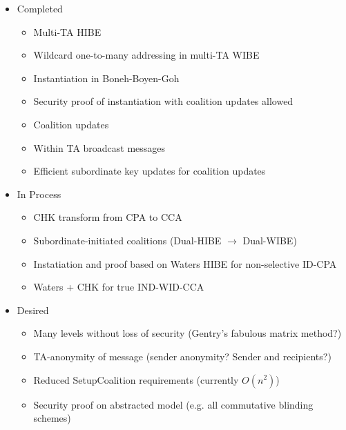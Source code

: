\documentclass[10pt]{llncs}
\begin{document}
\begin{itemize}
	\item Completed
	\begin{itemize}
		\item Multi-TA HIBE
		\item Wildcard one-to-many addressing in multi-TA WIBE
		\item Instantiation in Boneh-Boyen-Goh
		\item Security proof of instantiation with coalition updates allowed
		\item Coalition updates
		\item Within TA broadcast messages
		\item Efficient subordinate key updates for coalition updates
	\end{itemize}
	\item In Process
	\begin{itemize}
		\item CHK transform from CPA to CCA
		\item Subordinate-initiated coalitions (Dual-HIBE $\rightarrow$ Dual-WIBE)
		\item Instatiation and proof based on Waters HIBE for non-selective ID-CPA
		\item Waters + CHK for true IND-WID-CCA
	\end{itemize}
	\item Desired
	\begin{itemize}
		\item Many levels without loss of security (Gentry's fabulous matrix method?)
		\item TA-anonymity of message (sender anonymity? Sender and recipients?)
		\item Reduced SetupCoalition requirements (currently $O(n^2)$)
		\item Security proof on abstracted model (e.g. all commutative blinding schemes)
	\end{itemize}
\end{itemize}
\end{document}
